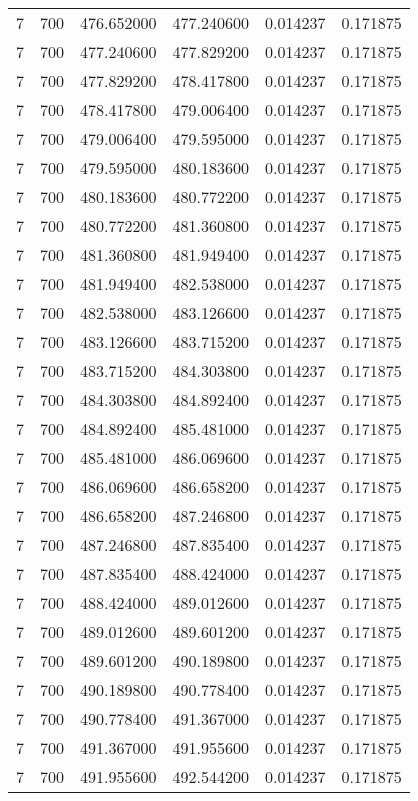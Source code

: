 \begin{longtable}{rrrrrr}
7 & 700 & 476.652000 & 477.240600 & 0.014237 & 0.171875 \\
7 & 700 & 477.240600 & 477.829200 & 0.014237 & 0.171875 \\
7 & 700 & 477.829200 & 478.417800 & 0.014237 & 0.171875 \\
7 & 700 & 478.417800 & 479.006400 & 0.014237 & 0.171875 \\
7 & 700 & 479.006400 & 479.595000 & 0.014237 & 0.171875 \\
7 & 700 & 479.595000 & 480.183600 & 0.014237 & 0.171875 \\
7 & 700 & 480.183600 & 480.772200 & 0.014237 & 0.171875 \\
7 & 700 & 480.772200 & 481.360800 & 0.014237 & 0.171875 \\
7 & 700 & 481.360800 & 481.949400 & 0.014237 & 0.171875 \\
7 & 700 & 481.949400 & 482.538000 & 0.014237 & 0.171875 \\
7 & 700 & 482.538000 & 483.126600 & 0.014237 & 0.171875 \\
7 & 700 & 483.126600 & 483.715200 & 0.014237 & 0.171875 \\
7 & 700 & 483.715200 & 484.303800 & 0.014237 & 0.171875 \\
7 & 700 & 484.303800 & 484.892400 & 0.014237 & 0.171875 \\
7 & 700 & 484.892400 & 485.481000 & 0.014237 & 0.171875 \\
7 & 700 & 485.481000 & 486.069600 & 0.014237 & 0.171875 \\
7 & 700 & 486.069600 & 486.658200 & 0.014237 & 0.171875 \\
7 & 700 & 486.658200 & 487.246800 & 0.014237 & 0.171875 \\
7 & 700 & 487.246800 & 487.835400 & 0.014237 & 0.171875 \\
7 & 700 & 487.835400 & 488.424000 & 0.014237 & 0.171875 \\
7 & 700 & 488.424000 & 489.012600 & 0.014237 & 0.171875 \\
7 & 700 & 489.012600 & 489.601200 & 0.014237 & 0.171875 \\
7 & 700 & 489.601200 & 490.189800 & 0.014237 & 0.171875 \\
7 & 700 & 490.189800 & 490.778400 & 0.014237 & 0.171875 \\
7 & 700 & 490.778400 & 491.367000 & 0.014237 & 0.171875 \\
7 & 700 & 491.367000 & 491.955600 & 0.014237 & 0.171875 \\
7 & 700 & 491.955600 & 492.544200 & 0.014237 & 0.171875 \\

\end{longtable}
